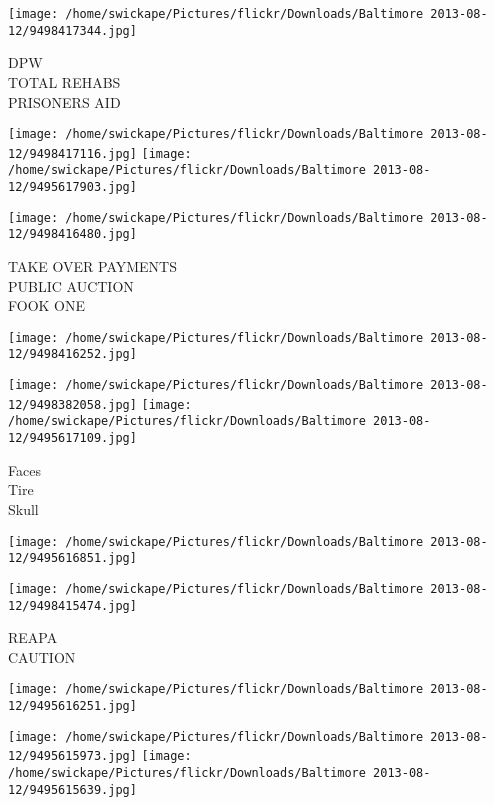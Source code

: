 \documentclass[10pt,letterpaper]{article}
\begin{document}
\vspace{0.25in}
\texttt{[image: /home/swickape/Pictures/flickr/Downloads/Baltimore 2013-08-12/9498417344.jpg]}

DPW\\
TOTAL REHABS\\
PRISONERS AID\\
\pagebreak

\texttt{[image: /home/swickape/Pictures/flickr/Downloads/Baltimore 2013-08-12/9498417116.jpg]}
\texttt{[image: /home/swickape/Pictures/flickr/Downloads/Baltimore 2013-08-12/9495617903.jpg]}

\texttt{[image: /home/swickape/Pictures/flickr/Downloads/Baltimore 2013-08-12/9498416480.jpg]}

TAKE OVER PAYMENTS\\
PUBLIC AUCTION\\
FOOK ONE\\
\pagebreak

\texttt{[image: /home/swickape/Pictures/flickr/Downloads/Baltimore 2013-08-12/9498416252.jpg]}

\vspace{0.25in}
\texttt{[image: /home/swickape/Pictures/flickr/Downloads/Baltimore 2013-08-12/9498382058.jpg]}
\texttt{[image: /home/swickape/Pictures/flickr/Downloads/Baltimore 2013-08-12/9495617109.jpg]}

Faces\\
Tire\\
Skull\\
\pagebreak

\texttt{[image: /home/swickape/Pictures/flickr/Downloads/Baltimore 2013-08-12/9495616851.jpg]}

\vspace{0.25in}
\texttt{[image: /home/swickape/Pictures/flickr/Downloads/Baltimore 2013-08-12/9498415474.jpg]}

REAPA\\
CAUTION\\
\pagebreak

\texttt{[image: /home/swickape/Pictures/flickr/Downloads/Baltimore 2013-08-12/9495616251.jpg]}

\vspace{0.25in}
\texttt{[image: /home/swickape/Pictures/flickr/Downloads/Baltimore 2013-08-12/9495615973.jpg]}
\texttt{[image: /home/swickape/Pictures/flickr/Downloads/Baltimore 2013-08-12/9495615639.jpg]}
\end{document}
